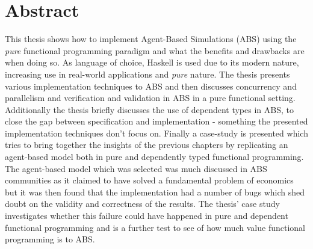 \documentclass[oneside]{book}
\begin{document}
\section*{Abstract}
This thesis shows how to implement Agent-Based Simulations (ABS) using the \textit{pure} functional programming paradigm and what the benefits and drawbacks are when doing so. As language of choice, Haskell is used due to its modern nature, increasing use in real-world applications and \textit{pure} nature. The thesis presents various implementation techniques to ABS and then discusses concurrency and parallelism and verification and validation in ABS in a pure functional setting. Additionally the thesis briefly discusses the use of dependent types in ABS, to close the gap between specification and implementation - something the presented implementation techniques don't focus on.
Finally a case-study is presented which tries to bring together the insights of the previous chapters by replicating an agent-based model both in pure and dependently typed functional programming. The agent-based model which was selected was much discussed in ABS communities as it claimed to have solved a fundamental problem of economics but it was then found that the implementation had a number of bugs which shed doubt on the validity and correctness of the results. The thesis' case study investigates whether this failure could have happened in pure and dependent functional programming and is a further test to see of how much value functional programming is to ABS. \\
\end{document}
